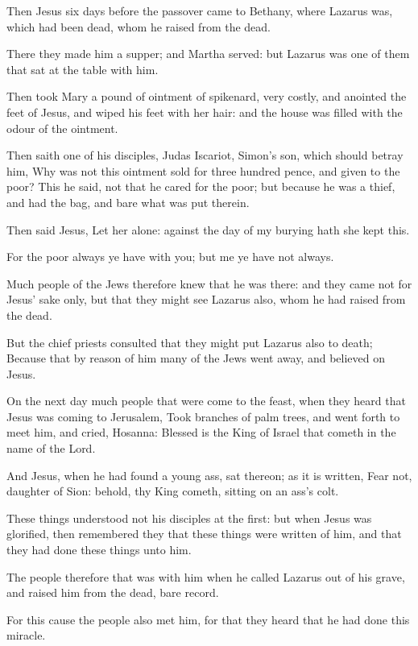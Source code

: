 \Chapter
\Verse Then Jesus six days before the passover came to Bethany, where Lazarus was, which had been dead, whom he raised from the dead.

\Verse There they made him a supper; and Martha served: but Lazarus was one of them that sat at the table with him.

\Verse Then took Mary a pound of ointment of spikenard, very costly, and anointed the feet of Jesus, and wiped his feet with her hair: and the house was filled with the odour of the ointment.

\Verse Then saith one of his disciples, Judas Iscariot, Simon's son, which should betray him, \Verse Why was not this ointment sold for three hundred pence, and given to the poor?  \Verse This he said, not that he cared for the poor; but because he was a thief, and had the bag, and bare what was put therein.

\Verse Then said Jesus, Let her alone: against the day of my burying hath she kept this.

\Verse For the poor always ye have with you; but me ye have not always.

\Verse Much people of the Jews therefore knew that he was there: and they came not for Jesus' sake only, but that they might see Lazarus also, whom he had raised from the dead.

\Verse But the chief priests consulted that they might put Lazarus also to death; \Verse Because that by reason of him many of the Jews went away, and believed on Jesus.

\Verse On the next day much people that were come to the feast, when they heard that Jesus was coming to Jerusalem, \Verse Took branches of palm trees, and went forth to meet him, and cried, Hosanna: Blessed is the King of Israel that cometh in the name of the Lord.

\Verse And Jesus, when he had found a young ass, sat thereon; as it is written, \Verse Fear not, daughter of Sion: behold, thy King cometh, sitting on an ass's colt.

\Verse These things understood not his disciples at the first: but when Jesus was glorified, then remembered they that these things were written of him, and that they had done these things unto him.

\Verse The people therefore that was with him when he called Lazarus out of his grave, and raised him from the dead, bare record.

\Verse For this cause the people also met him, for that they heard that he had done this miracle.

